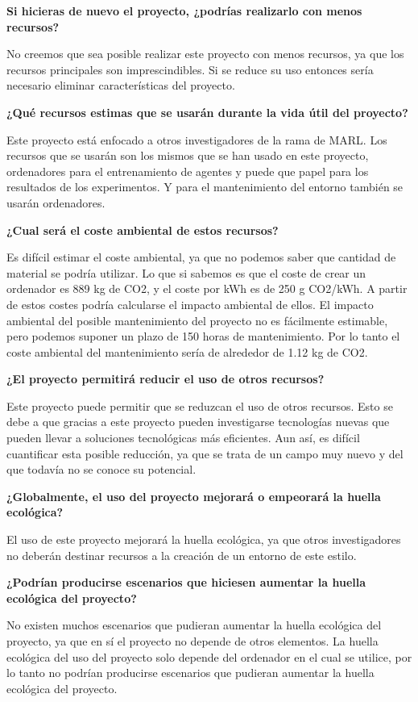 \textbf{Si hicieras de nuevo el proyecto, ¿podrías realizarlo con menos recursos?}

No creemos que sea posible realizar este proyecto con menos recursos, ya que los recursos principales son imprescindibles. Si se reduce su uso entonces sería necesario eliminar características del proyecto.

\textbf{¿Qué recursos estimas que se usarán durante la vida útil del proyecto?}

Este proyecto está enfocado a otros investigadores de la rama de MARL. Los recursos que se usarán son los mismos que se han usado en este proyecto, ordenadores para el entrenamiento de agentes y puede que papel para los resultados de los experimentos. Y para el mantenimiento del entorno también se usarán ordenadores.

\textbf{¿Cual será el coste ambiental de estos recursos?}

Es difícil estimar el coste ambiental, ya que no podemos saber que cantidad de material se podría utilizar. Lo que si sabemos es que el coste de crear un ordenador es 889 kg de CO2, y el coste por kWh es de 250 g CO2/kWh. A partir de estos costes podría calcularse el impacto ambiental de ellos. El impacto ambiental del posible mantenimiento del proyecto no es fácilmente estimable, pero podemos suponer un plazo de 150 horas de mantenimiento. Por lo tanto el coste ambiental del mantenimiento sería de alrededor de 1.12 kg de CO2.

\textbf{¿El proyecto permitirá reducir el uso de otros recursos?}

Este proyecto puede permitir que se reduzcan el uso de otros recursos. Esto se debe a que gracias a este proyecto pueden investigarse tecnologías nuevas que pueden llevar a soluciones tecnológicas más eficientes. Aun así, es difícil cuantificar esta posible reducción, ya que se trata de un campo muy nuevo y del que todavía no se conoce su potencial.

\textbf{¿Globalmente, el uso del proyecto mejorará o empeorará la huella ecológica?}

El uso de este proyecto mejorará la huella ecológica, ya que otros investigadores no deberán destinar recursos a la creación de un entorno de este estilo.

\textbf{¿Podrían producirse escenarios que hiciesen aumentar la huella ecológica del proyecto?}

No existen muchos escenarios que pudieran aumentar la huella ecológica del proyecto, ya que en sí el proyecto no depende de otros elementos. La huella ecológica del uso del proyecto solo depende del ordenador en el cual se utilice, por lo tanto no podrían producirse escenarios que pudieran aumentar la huella ecológica del proyecto.

